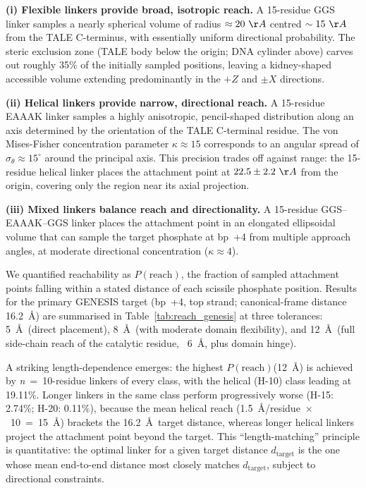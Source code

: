 \documentclass[11pt,a4paper]{article}
\newcommand{\angstrom}{\AA}
\newcommand{\preach}{P(\mathrm{reach})}
\begin{document}
\textbf{(i) Flexible linkers provide broad, isotropic reach.} A 15-residue GGS linker
samples a nearly spherical volume of radius $\approx 20~\angstrom$ centred $\sim 15~\angstrom$
from the TALE C-terminus, with essentially uniform directional probability. The steric
exclusion zone (TALE body below the origin; DNA cylinder above) carves out roughly 35\%
of the initially sampled positions, leaving a kidney-shaped accessible volume extending
predominantly in the $+Z$ and $\pm X$ directions.

\textbf{(ii) Helical linkers provide narrow, directional reach.} A 15-residue EAAAK
linker samples a highly anisotropic, pencil-shaped distribution along an axis
determined by the orientation of the TALE C-terminal residue. The von Mises-Fisher
concentration parameter $\kappa \approx 15$ corresponds to an angular spread of
$\sigma_\theta \approx 15^\circ$ around the principal axis. This precision trades
off against range: the 15-residue helical linker places the attachment point at
$22.5 \pm 2.2~\angstrom$ from the origin, covering only the region near its axial
projection.

\textbf{(iii) Mixed linkers balance reach and directionality.} A 15-residue GGS--EAAAK--GGS
linker places the attachment point in an elongated ellipsoidal volume that can sample
the target phosphate at bp~+4 from multiple approach angles, at moderate directional
concentration ($\kappa \approx 4$).

We quantified reachability as $\preach$, the fraction of sampled attachment points
falling within a stated distance of each scissile phosphate position. Results for
the primary GENESIS target (bp~+4, top strand; canonical-frame distance 16.2~\angstrom)
are summarised in Table~\ref{tab:reach_genesis} at three tolerances: 5~\AA\ (direct placement),
8~\AA\ (with moderate domain flexibility), and 12~\AA\ (full side-chain reach of the
catalytic residue, ~6~\AA, plus domain hinge).

A striking length-dependence emerges: the highest $\preach$(12~\AA) is achieved by
\textit{n}~=~10-residue linkers of every class, with the helical (H-10) class leading
at 19.11\%. Longer linkers in the same class perform progressively worse (H-15: 2.74\%;
H-20: 0.11\%), because the mean helical reach (1.5~\AA/residue~$\times$~10~=~15~\AA)
brackets the 16.2~\AA\ target distance, whereas longer helical linkers project the
attachment point beyond the target. This ``length-matching'' principle is quantitative:
the optimal linker for a given target distance $d_\mathrm{target}$ is the one whose
mean end-to-end distance most closely matches $d_\mathrm{target}$, subject to
directional constraints.
\end{document}
